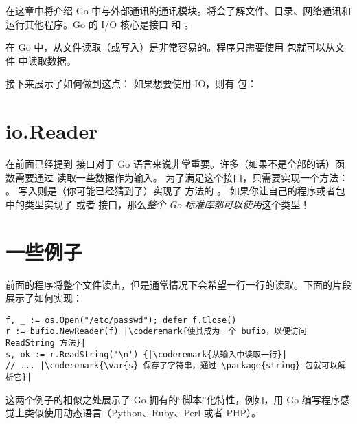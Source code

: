 \noindent{}在这章中将介绍 Go 中与外部通讯的通讯模块。将会了解文件、目录、网络通讯和运行其他程序。Go 的 I/O 核心是接口  和 。

在 Go 中，从文件读取（或写入）是非常容易的。程序只需要使用
 包就可以从文件  中读取数据。

接下来展示了如何做到这点：
\showremarks
如果想要使用 IO，则有
 包：

\showremarks

\section{io.Reader}
在前面已经提到  接口对于 Go 语言来说非常重要。许多（如果不是全部的话）函数需要通过 
 读取一些数据作为输入。
为了满足这个接口，只需要实现一个方法：
。
写入则是（你可能已经猜到了）实现了  方法的 。
如果你让自己的程序或者包中的类型实现了  或者
 接口，那么\emph{整个 Go 标准库都可以使用}这个类型！

\section{一些例子}

前面的程序将整个文件读出，但是通常情况下会希望一行一行的读取。下面的片段展示了如何实现：

\begin{lstlisting}
f, _ := os.Open("/etc/passwd"); defer f.Close()
r := bufio.NewReader(f) |\coderemark{使其成为一个 bufio，以便访问 ReadString 方法}|
s, ok := r.ReadString('\n') {|\coderemark{从输入中读取一行}|
// ... |\coderemark{\var{s} 保存了字符串，通过 \package{string} 包就可以解析它}|
\end{lstlisting}
这两个例子的相似之处展示了 Go 拥有的``脚本''化特性，例如，用 Go  编写程序感觉上类似使用动态语言（Python、Ruby、Perl 或者 PHP）。


